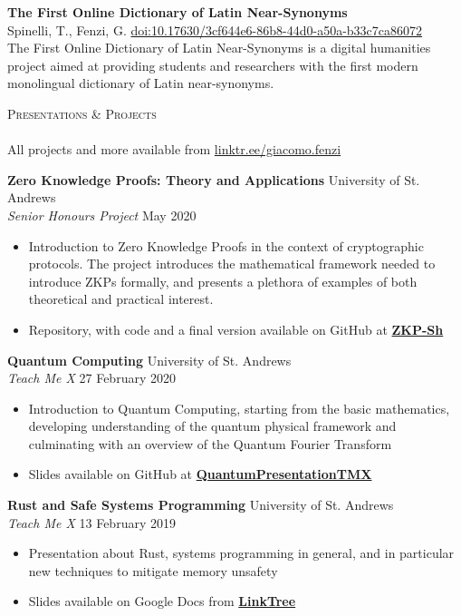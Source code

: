 \documentclass[a4paper]{article}
\newcommand{\lineunder} {
    \vspace*{-8pt} \\
    \hspace*{-18pt} \hrulefill \\
}
\newcommand{\header} [1] {
    {\hspace*{-18pt}\vspace*{6pt} \textsc{#1}}
    \vspace*{-6pt} \lineunder
}
\begin{document}
\vbox{
    {\textbf{The First Online Dictionary of Latin Near-Synonyms}} \\
    Spinelli, T., Fenzi, G. \hfill \href{https://risweb.st-andrews.ac.uk/portal/en/datasets/the-first-online-dictionary-of-latin-nearsynonyms(3cf644e6-86b8-44d0-a50a-b33c7ca86072).html}{doi:10.17630/3cf644e6-86b8-44d0-a50a-b33c7ca86072}\\
    The First Online Dictionary of Latin Near-Synonyms is a digital humanities project aimed at providing students and researchers with the first modern monolingual dictionary of Latin near-synonyms. \\
}

\header{Presentations \& Projects}

All projects and more available from \href{https://linktr.ee/giacomo.fenzi}{\url{linktr.ee/giacomo.fenzi}}

\vspace{5mm}

\textbf{Zero Knowledge Proofs: Theory and Applications} \hfill University of St. Andrews \\
\textit{Senior Honours Project} \hfill{May 2020}
\vspace{-1mm}
\begin{itemize} \itemsep 1pt
    \item Introduction to Zero Knowledge Proofs in the context of cryptographic protocols. The project introduces the mathematical 
    framework needed to introduce ZKPs formally, and presents a plethora of examples of both theoretical and practical interest.
    \item Repository, with code and a final version available on GitHub at \href{https://github.com/WizardOfMenlo/ZKP-Sh}{\textbf{ZKP-Sh}}
\end{itemize}

\textbf{Quantum Computing} \hfill University of St. Andrews \\
\textit{Teach Me X} \hfill{27 February 2020}
\vspace{-1mm}
\begin{itemize} \itemsep 1pt
    \item Introduction to Quantum Computing, starting from the basic mathematics, developing understanding of the quantum physical framework
    and culminating with an overview of the Quantum Fourier Transform
    \item Slides available on GitHub at \href{https://github.com/WizardOfMenlo/QuantumPresentationTMX}{ \textbf{QuantumPresentationTMX}}
\end{itemize}

\textbf{Rust and Safe Systems Programming} \hfill University of St. Andrews \\
\textit{Teach Me X} \hfill{13 February 2019}
\vspace{-1mm}
\begin{itemize} \itemsep 1pt
    \item Presentation about Rust, systems programming in general, and in particular new techniques to mitigate memory unsafety
    \item Slides available on Google Docs from \href{https://docs.google.com/presentation/d/1ui4ByY8qFhqAsdYoyPBPzhyg8AbV5YJKAN9sNwv5QPw/edit?usp=sharing}{\textbf{LinkTree}} 
\end{itemize}
\end{document}
